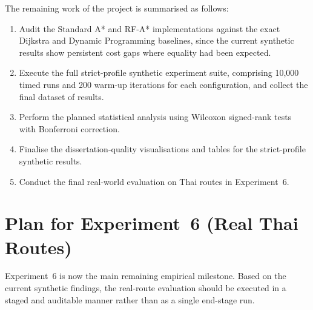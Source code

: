 The remaining work of the project is summarised as follows:

\begin{enumerate}
    \item Audit the Standard A* and RF-A* implementations against the exact Dijkstra and Dynamic Programming baselines, since the current synthetic results show persistent cost gaps where equality had been expected.
    \item Execute the full strict-profile synthetic experiment suite, comprising 10,000 timed runs and 200 warm-up iterations for each configuration, and collect the final dataset of results.
    \item Perform the planned statistical analysis using Wilcoxon signed-rank tests with Bonferroni correction.
    \item Finalise the dissertation-quality visualisations and tables for the strict-profile synthetic results.
    \item Conduct the final real-world evaluation on Thai routes in Experiment~6.
\end{enumerate}

\section{Plan for Experiment~6 (Real Thai Routes)}

Experiment~6 is now the main remaining empirical milestone.
Based on the current synthetic findings, the real-route evaluation should be executed in a staged and auditable manner rather than as a single end-stage run.

